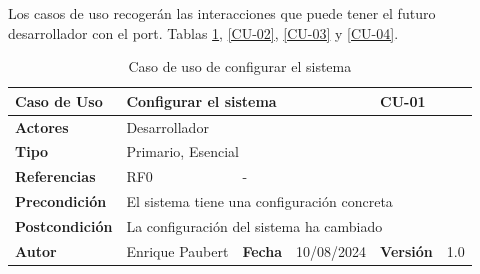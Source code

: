 Los casos de uso recogerán las interacciones que puede tener el futuro desarrollador con el port. Tablas \ref{CU-01}, \ref{CU-02}, \ref{CU-03} y \ref{CU-04}.

\begin{table}[!ht]
    \begin{tabular}{|l|l|l|l|l|l|}
	\hline
	\textbf{Caso de Uso} & \multicolumn{3}{l|}{Configurar el sistema} & \multicolumn{2}{l|}{CU-01} \\ \hline
	\textbf{Actores} & \multicolumn{5}{l|}{Desarrollador} \\ \hline
	\textbf{Tipo} & \multicolumn{5}{l|}{Primario, Esencial} \\ \hline
	\textbf{Referencias} & RF0 & \multicolumn{4}{l|}{-} \\ \hline
	\textbf{Precondición} & \multicolumn{5}{l|}{El sistema tiene una configuración concreta} \\ \hline
	\textbf{Postcondición} & \multicolumn{5}{l|}{La configuración del sistema ha cambiado} \\ \hline
	\textbf{Autor} & Enrique Paubert & \textbf{Fecha} & 10/08/2024 & \textbf{Versión} & 1.0 \\ \hline
    \end{tabular}%
    \caption{Caso de uso de configurar el sistema}
    \label{CU-01}
\end{table}

